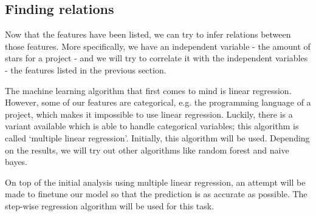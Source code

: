     
    
    \subsection{Finding relations}
        Now that the features have been listed, we can try to infer relations between those features. More specifically, we have an independent variable - the amount of stars for a project - and we will try to correlate it with the independent variables - the features listed in the previous section.
        
        The machine learning algorithm that first comes to mind is linear regression. However, some of our features are categorical, e.g. the programming language of a project, which makes it impossible to use linear regression.
        Luckily, there is a variant available which is able to handle categorical variables; this algorithm is called `multiple linear regression'. 
        Initially, this algorithm will be used. Depending on the results, we will try out other algorithms like random forest and naive bayes.
        
        On top of the initial analysis using multiple linear regression, an attempt will be made to finetune our model so that the prediction is as accurate as possible. The step-wise regression algorithm will be used for this task.
    
